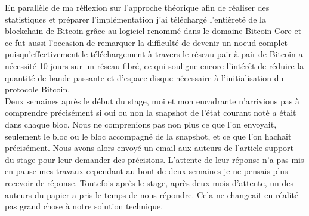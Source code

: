 \documentclass[12pt,a4paper]{article}
\begin{document}
	En parallèle de ma réflexion sur l'approche théorique afin de réaliser des statistiques et préparer l'implémentation j'ai téléchargé l'entièreté de la blockchain de Bitcoin grâce au logiciel renommé dans le domaine Bitcoin Core et ce fut aussi l'occasion de remarquer la difficulté de devenir un noeud complet puisqu'effectivement le téléchargement à travers le réseau pair-à-pair de Bitcoin a nécessité 10 jours sur un réseau fibré, ce qui souligne encore l'intérêt de réduire la quantité de bande passante et d'espace disque nécessaire à l'initialisation du protocole Bitcoin.\\ %
	Deux semaines après le début du stage, moi et mon encadrante n'arrivions pas à comprendre précisément si oui ou non la snapshot de l'état courant noté $a$ était dans chaque bloc. Nous ne comprenions pas non plus ce que l'on envoyait, seulement le bloc ou le bloc accompagné de la snapshot, et ce que l'on hachait précisément. Nous avons alors envoyé un email aux auteurs de l'article support du stage pour leur demander des précisions. L'attente de leur réponse n'a pas mis en pause mes travaux cependant au bout de deux semaines je ne pensais plus recevoir de réponse. Toutefois après le stage, après deux mois d'attente, un des auteurs du papier a pris le temps de nous répondre. Cela ne changeait en réalité pas grand chose à notre solution technique.\\ %
	
\end{document}
